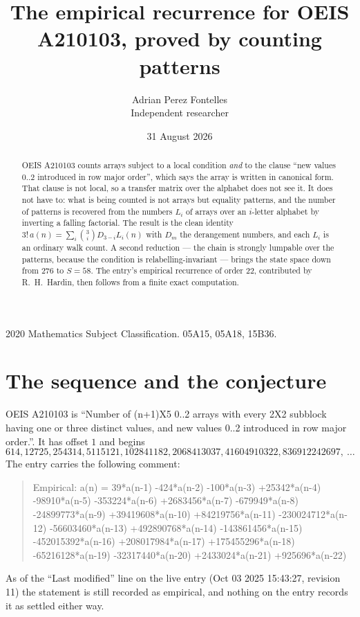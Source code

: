 \documentclass[11pt,a4paper]{article}
\title{The empirical recurrence for OEIS A210103, proved by counting patterns}
\author{Adrian Perez Fontelles\\ \small Independent researcher}
\date{31 August 2026}
\theoremstyle{plain}
\theoremstyle{definition}
\begin{document}
\maketitle

\begin{abstract}
OEIS A210103 counts arrays subject to a local condition \emph{and} to the clause ``new values
$0..2$ introduced in row major order'', which says the array is written in canonical
form. That clause is not local, so a transfer matrix over the alphabet does not see it. It
does not have to: what is being counted is not arrays but equality patterns, and the number
of patterns is recovered from the numbers $L_i$ of arrays over an $i$-letter alphabet by
inverting a falling factorial. The result is the clean identity
$3!\,a(n)=\sum_i\binom{3}{i}D_{3-i}L_i(n)$ with $D_m$ the derangement numbers,
and each $L_i$ is an ordinary walk count. A second reduction --- the chain is strongly
lumpable over the patterns, because the condition is relabelling-invariant --- brings the
state space down from $276$ to $S=58$. The entry's empirical recurrence of order
$22$, contributed by R.~H.~Hardin, then follows from a finite exact computation.
\end{abstract}

\noindent\small 2020 Mathematics Subject Classification. 05A15, 05A18, 15B36.\normalsize

\section{The sequence and the conjecture}

OEIS A210103 is ``Number of (n+1)X5 0..2 arrays with every 2X2 subblock having one or three distinct values, and new values 0..2 introduced in row major order.''. It has offset $1$ and begins
\[
614, 12725, 254314, 5115121, 102841182, 2068413037, 41604910322, 836912242697,\ \dots
\]
The entry carries the following comment:
\begin{quote}\small
Empirical: a(n) = 39*a(n-1) -424*a(n-2) -100*a(n-3) +25342*a(n-4) -98910*a(n-5) -353224*a(n-6) +2683456*a(n-7) -679949*a(n-8) -24899773*a(n-9) +39419608*a(n-10) +84219756*a(n-11) -230024712*a(n-12) -56603460*a(n-13) +492890768*a(n-14) -143861456*a(n-15) -452015392*a(n-16) +208017984*a(n-17) +175455296*a(n-18) -65216128*a(n-19) -32317440*a(n-20) +2433024*a(n-21) +925696*a(n-22)
\end{quote}
As of the ``Last modified'' line on the live entry (Oct 03 2025 15:43:27, revision 11) the statement is
still recorded as empirical, and nothing on the entry records it as settled either way.
\end{document}
